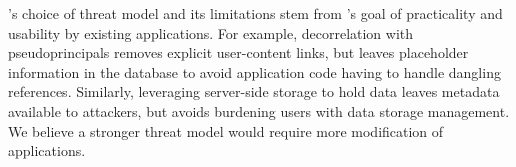 \sys's choice of threat model and its limitations stem from
\sys's goal of practicality and usability by existing applications.
%
For example, decorrelation with pseudoprincipals removes explicit user-content
links, but leaves placeholder information in the database to avoid application
code having to handle dangling references.
%
Similarly, leveraging server-side storage to hold \xxed data leaves
metadata available to attackers, but avoids burdening users with data storage
management.
%
We believe a stronger threat model would require more modification of
applications.
